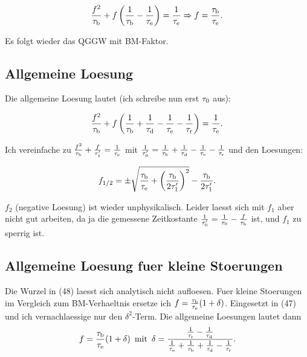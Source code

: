 \begin{equation}
 \frac{f^2}{\tau_{\textrm{b}}} + f\left( \frac{1}{\tau_{\textrm{b}}} - \frac{1}{\tau_\textrm{e}} \right) = \frac{1}{\tau_\textrm{e}} \Rightarrow f = \frac{\tau_{\textrm{b}}}{\tau_\textrm{e}}. 
\end{equation}

\noindent
Es folgt wieder das QGGW mit BM-Faktor. 

\subsection{Allgemeine Loesung}
Die allgemeine Loesung lautet (ich schreibe nun erst $\tau_{0}$ aus):

\begin{equation}
  \frac{f^2}{\tau_{\textrm{b}}} + f \left( \frac{1}{\tau_{\textrm{b}}} + \frac{1}{\tau_{\textrm{d}}} - \frac{1}{\tau_\textrm{e}} -\frac{1}{\tau_\textrm{r}} \right) = \frac{1}{\tau_\textrm{e}}.
 \label{eq:solvefallgemein}
\end{equation}

\noindent
Ich vereinfache zu $\frac{f^2}{\tau_{\textrm{b}}} + \frac{f}{\tau_{1}^{\prime}} = \frac{1}{\tau_\textrm{e}}$ mit $\frac{1}{\tau_{0}^{\prime}} = \frac{1}{\tau_{\textrm{b}}} + \frac{1}{\tau_{\textrm{d}}} - \frac{1}{\tau_\textrm{e}} -\frac{1}{\tau_\textrm{r}} $ und den Loesungen:

\begin{equation}
 f_{1/2} = \pm \sqrt{\frac{\tau_{\textrm{b}}}{\tau_\textrm{e}} + \left( \frac{\tau_{\textrm{b}}}{2\tau_{1}^{\prime}}\right)^2 } - \frac{\tau_{\textrm{b}}}{2\tau_{1}^{\prime}}. 
\end{equation}

\noindent
$f_2$ (negative Loesung) ist wieder unphysikalisch. 
Leider laesst sich mit $f_1$ aber nicht gut arbeiten, da ja die gemessene Zeitkostante $\frac{1}{\tau_{0}^{\prime}} = \frac{1}{\tau_{0}} - \frac{f}{\tau_{\textrm{b}}}$ ist, und $f_1$ zu sperrig ist. 


\subsection{Allgemeine Loesung fuer kleine Stoerungen}
\noindent
Die Wurzel in (48) laesst sich analytisch nicht aufloesen. 
Fuer kleine Stoerungen im Vergleich zum BM-Verhaeltnis ersetze ich $f = \frac{\tau_{\textrm{b}}}{\tau_\textrm{e}}(1 + \delta)$. 
Eingesetzt in (47) und ich vernachlaessige nur den $\delta^2$-Term. 
Die allgemeine Loesungen lautet dann 
\begin{equation}
 f = \frac{\tau_{\textrm{b}}}{\tau_\textrm{e}}(1 + \delta)\,\,\,\textrm{mit} \,\,\, \delta = \frac{\frac{1}{\tau_\textrm{r}} - \frac{1}{\tau_{\textrm{d}}}}{\frac{1}{\tau_\textrm{e}} + \frac{1}{\tau_{\textrm{b}}} + \frac{1}{\tau_{\textrm{d}}} - \frac{1}{\tau_\textrm{r}}}. 
\end{equation}

